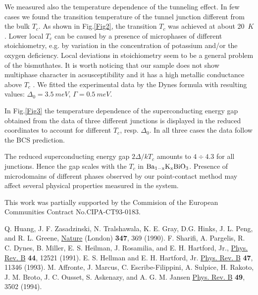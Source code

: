 \documentclass[twocolumn,amsmath,floats,showpacs,nofootinbib]{revtex4}
\begin{document}
We measured also the temperature dependence of the tunneling effect. In few cases we found the transition temperature of the tunnel junction different from the bulk $T_c$. As shown in Fig.\ref{Fig2}, the transition $T_c$ was achieved at about 20~$K$. Lower local $T_c$ can be caused by a presence of microphases of different stoichiometry, e.g. by variation in the concentration of potassium and/or the oxygen deficiency. Local deviations in stoichiometry seem to be a general problem of the bismuthates. It is worth noticing that our sample does not show multiphase character in acsusceptibility and it has a high metallic conductance above $T_c$ \cite{4}. We fitted the experimental data by the Dynes formula with resulting values: $\Delta_0=3.5\ meV$, $\Gamma=0.5\ meV$.


In Fig.\ref{Fig3} the temperature dependence of the superconducting energy gap obtained from the data of three different junctions is displayed in the reduced coordinates to account for different $T_c$, resp. $\Delta_0$. In all three cases the data follow the BCS prediction.

The reduced superconducting energy gap $2\Delta/kT_c$ amounts to $4\div 4.3$ for all junctions. Hence the gap scales with the $T_c$ in $\rm Ba_{1-x}K_xBiO_3$. Presence of microdomains of different phases observed by our point-contact method may affect several physical properties measured in the system.

This work was partially supported by the Commision of the European Communities Contract No.CIPA-CT93-0183.

\begin{thebibliography}{}



 Q. Huang, J. F. Zasadzinski, N. Tralshawala, K. E. Gray, D.G. Hinks, J. L. Peng, and R. L. Greene, \href{http://www.nature.com/nature/journal/v347/n6291/pdf/347369a0.pdf}{Nature} (London) \textbf{347}, 369 (1990).
 F. Sharifi, A. Pargelis, R. C. Dynes, B. Miller, E. S. Heilman, J. Rosamilia, and E. H. Hartford, Jr., \href{https://doi.org/10.1103/PhysRevB.44.12521}{Phys. Rev. B} \textbf{44}, 12521 (1991).
 E. S. Hellman and E. H. Hartford, Jr.
\href{https://doi.org/10.1103/PhysRevB.47.11346}{Phys. Rev. B} \textbf{47}, 11346 (1993).
M. Affronte, J. Marcus, C. Escribe-Filippini, A. Sulpice, H. Rakoto, J. M. Broto, J. C. Ousset, S. Askenazy, and A. G. M. Jansen
\href{https://doi.org/10.1103/PhysRevB.49.3502}{Phys. Rev. B} \textbf{49}, 3502 (1994).

	

\end{thebibliography}
\end{document}
